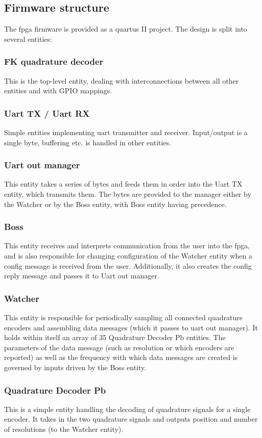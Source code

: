 \documentclass[twoside]{article}
\begin{document}
\subsection{Firmware structure}

The fpga firmware is provided as a quartus II project. The design is split into several entities:

\subsubsection{FK quadrature decoder}

This is the top-level entity, dealing with interconnections between all other entities and with GPIO mappings.

\subsubsection{Uart TX / Uart RX}

Simple entities implementing uart transmitter and receiver. Input/output is a single byte, buffering etc. is handled in other entities.

\subsubsection{Uart out manager}

This entity takes a series of bytes and feeds them in order into the Uart TX entity, which transmits them. The bytes are provided to the manager either by the Watcher or by the Boss entity, with Boss entity having precedence.

\subsubsection{Boss}

This entity receives and interprets communication from the user into the fpga, and is also responsible for changing configuration of the Watcher entity when a config message is received from the user. Additionally, it also creates the config reply message and passes it to Uart out manager.

\subsubsection{Watcher}

This entity is responsible for periodically sampling all connected quadrature encoders and assembling data messages (which it passes to uart out manager). It holds within itself an array of 35 Quadrature Decoder Pb entities. The parameters of the data message (such as resolution or which encoders are reported) as well as the frequency with which data messages are created is governed by inputs driven by the Boss entity.

\subsubsection{Quadrature Decoder Pb}

This is a simple entity handling the decoding of quadrature signals for a single encoder. It takes in the two quadrature signals and outputs position and number of resolutions (to the Watcher entity).
\end{document}
